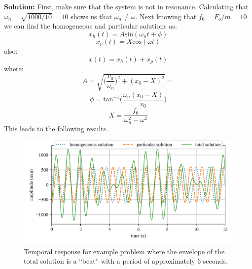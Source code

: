 \documentclass[12pt,letter]{article}
\begin{document}
\begin{example}
	\noindent\textbf{Solution:} First, make sure that the system is not in resonance. Calculating that $\omega_n = \sqrt{1000/10} = 10$ shows us that $\omega_n \neq \omega$. Next knowing that $f_0 = F_o/m = 10$ we can find the homogeneous and particular solutions as:
	\begin{equation}
		x_h(t) = A\text{sin}(\omega_n t + \phi)
	\end{equation}				
	\begin{equation}
		x_p(t) = X\text{cos}(\omega t) 
	\end{equation}	
	also:			
	\begin{equation}
		x(t) = x_h(t) + x_p(t)
	\end{equation}	
	where:			
	\begin{equation}
		A = \sqrt{\bigg(\frac{v_0}{\omega_n}\bigg)^2+(x_0-X)^2} = 
	\end{equation}				
	\begin{equation}
		\phi = \text{tan}^{-1}\bigg(\frac{\omega_n(x_0-X)}{v_0}\bigg)
	\end{equation}				
	\begin{equation}
		X = \frac{f_0}{\omega_n^2-\omega^2}
	\end{equation}			
	This leads to the following results. 
	\begin{figure}[H]
		\centering
		\includegraphics[]{../figures/homogeneous_and_particular_solutions.png}
		\caption{Temporal response for example problem where the envelope of the total solution is a ``beat'' with a period of approximately 6 seconds.}
	\end{figure}			

\end{example}
\end{document}
